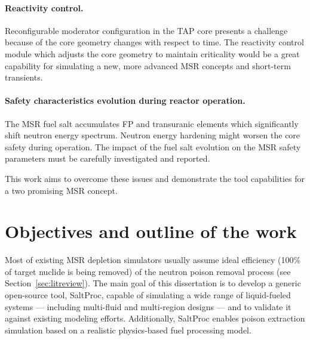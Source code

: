 \paragraph{Reactivity control.} Reconfigurable moderator configuration in the 
\gls{TAP} core presents a challenge because of the core geometry changes with 
respect to time. The reactivity control module which adjusts the core geometry 
to maintain criticality would be a great capability for simulating a new, more 
advanced \gls{MSR} concepts and short-term transients.
\paragraph{Safety characteristics evolution during reactor operation.} The 
\gls{MSR} fuel salt  accumulates \gls{FP} and transuranic elements which 
significantly shift neutron energy spectrum. Neutron energy hardening might 
worsen the core safety during operation. The impact of the fuel salt evolution 
on the \gls{MSR} safety parameters must be carefully investigated and reported.

This work aims to overcome these issues and demonstrate the tool capabilities 
for a two promising \gls{MSR} concept.


\section{Objectives and outline of the work}
Most of existing \gls{MSR} depletion simulators usually assume ideal  
efficiency (100\% of target nuclide is being removed) of the neutron poison 
removal process (see Section~\ref{sec:litreview}). The main goal of this 
dissertation is to develop a generic open-source tool, SaltProc, capable of 
simulating a wide range of liquid-fueled systems --- including multi-fluid and 
multi-region designs --- and to validate it against existing modeling efforts. 
Additionally, SaltProc enables poison extraction simulation based on a  
realistic physics-based fuel processing model. 

